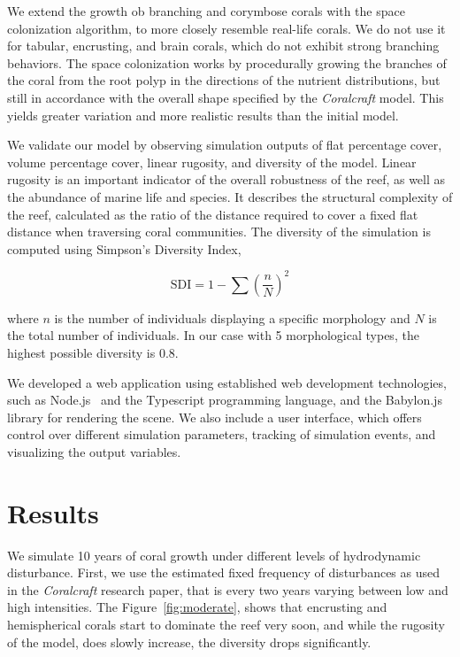 \documentclass[9pt]{pnas-new}
\begin{document}
We extend the growth ob branching and corymbose corals with the space colonization algorithm, to more closely resemble real-life corals. We do not use it for tabular, encrusting, and brain corals, which do not exhibit strong branching behaviors. The space colonization works by procedurally growing the branches of the coral from the root polyp in the directions of the nutrient distributions, but still in accordance with the overall shape specified by the \textit{Coralcraft} model. This yields greater variation and more realistic results than the initial model.

We validate our model by observing simulation outputs of flat percentage cover, volume percentage cover, linear rugosity, and diversity of the model. Linear rugosity is an important indicator of the overall robustness of the reef, as well as the abundance of marine life and species. It describes the structural complexity of the reef, calculated as the ratio of the distance required to cover a fixed flat distance when traversing coral communities. The diversity of the simulation is computed using Simpson’s Diversity Index, 

\begin{equation}
    \text{SDI} = 1 - \sum (\frac{n}{N})^2
\end{equation}

where $n$ is the number of individuals displaying a specific morphology and $N$ is the total number of individuals. In our case with 5 morphological types, the highest possible diversity is 0.8.

We developed a web application using established web development technologies, such as Node.js~\cite{nodejs} and the Typescript programming language, and the Babylon.js~\cite{babylonjs} library for rendering the scene. We also include a user interface, which offers control over different simulation parameters, tracking of simulation events, and visualizing the output variables. 

\section*{Results}

We simulate 10 years of coral growth under different levels of hydrodynamic disturbance. First, we use the estimated fixed frequency of disturbances as used in the \textit{Coralcraft} research paper, that is every two years varying between low and high intensities. The Figure~\ref{fig:moderate}, shows that encrusting and hemispherical corals start to dominate the reef very soon, and while the rugosity of the model, does slowly increase, the diversity drops significantly.
\end{document}
